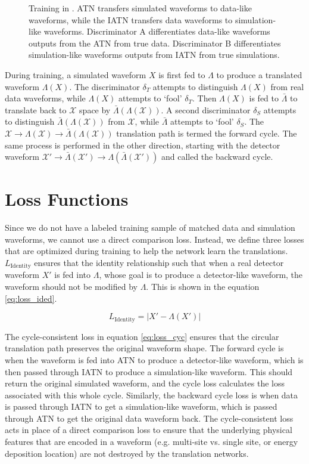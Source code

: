 \begin{figure}[htb!]
    \caption{Training in {\cpunet}. ATN transfers simulated waveforms to data-like waveforms, while the IATN transfers data waveforms to simulation-like waveforms. Discriminator A differentiates data-like waveforms outputs from the ATN from true data. Discriminator B differentiates simulation-like waveforms outputs from IATN from true simulations.}
   \label{fig:network_training}
\end{figure}

During training, a simulated waveform $X$ is first fed to $\Lambda$ to produce a translated waveform $\Lambda(X)$. The discriminator $\delta_{T}$ attempts to distinguish $\Lambda(X)$ from real data waveforms, while $\Lambda(X)$ attempts to `fool' $\delta_{T}$. Then $\Lambda(X)$ is fed to $\bar{\Lambda}$ to translate back to $\mathcal{X}$ space by $\bar{\Lambda}(\Lambda(\mathcal{X}))$. A second discriminator $\delta_{S}$ attempts to distinguish $\bar{\Lambda}(\Lambda(\mathcal{X}))$ from $\mathcal{X}$, while $\bar{\Lambda}$ attempts to `fool' $\delta_{S}$. The $\mathcal{X}\rightarrow{}\Lambda(\mathcal{X})\rightarrow{}\bar{\Lambda}(\Lambda(\mathcal{X}))$ translation path is termed the forward cycle. The same process is performed in the other direction, starting with the detector waveform $\mathcal{X}'\rightarrow{}\bar{\Lambda}(\mathcal{X}')\rightarrow{}\Lambda(\bar{\Lambda}(\mathcal{X}'))$ and called the backward cycle.

\section{Loss Functions}
Since we do not have a labeled training sample of matched data and simulation waveforms, we cannot use a direct comparison loss. Instead, we define three losses that are optimized during training to help the network learn the translations. $L_{\mathrm{Identity}}$ ensures that the identity relationship such that when a real detector waveform $X'$ is fed into $\Lambda$, whose goal is to produce a detector-like waveform, the waveform should not be modified by $\Lambda$. This is shown in the equation \ref{eq:loss_ided}. 

\begin{equation}\label{eq:loss_ided}
    L_{\mathrm{Identity}} = |X' - \Lambda(X')|
\end{equation}

The cycle-consistent loss in equation \ref{eq:loss_cyc} ensures that the circular translation path preserves the original waveform shape. The forward cycle is when the waveform is fed into ATN to produce a detector-like waveform, which is then passed through IATN to produce a simulation-like waveform. This should return the original simulated waveform, and the cycle loss calculates the loss associated with this whole cycle. Similarly, the backward cycle loss is when data is passed through IATN to get a simulation-like waveform, which is passed through ATN to get the original data waveform back. The cycle-consistent loss acts in place of a direct comparison loss to ensure that the underlying physical features that are encoded in a waveform (e.g. multi-site vs. single site, or energy deposition location) are not destroyed by the translation networks.

